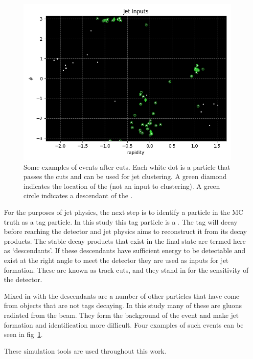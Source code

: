 \begin{figure}[htp]
\begin{minipage}[c]{0.48\textwidth}
        \includegraphics[width=1\textwidth]{graphics/truth_1378.png}
    \end{minipage}\hfill
    \caption{Some examples of events after cuts. Each white dot is a particle that
             passes the cuts and can be used for jet clustering.
             A green diamond indicates the location of the 
             (not an input to clustering).
         A green circle indicates a descendant of the .} \label{fig:event_tracks_example}
\end{figure}    


For the purposes of jet physics, the next step is to identify
a particle in the MC truth as a tag particle.
In this study this tag particle is a .
The tag will decay before reaching the detector and 
jet physics aims to reconstruct it from its decay products.
The stable decay products that exist in the final state 
are termed here as `descendants'.
If these descendants have sufficient energy to be detectable and exist
at the right angle to meet the detector they are used as inputs for jet formation.
These are known as track cuts, and they stand in for the sensitivity of the detector.

Mixed in with the descendants are a number of other particles that have come from objects
that are not tags decaying.
In this study many of these are gluons radiated from the beam.
They form the background of the event and make jet formation
and identification more difficult.
Four examples of such events can be seen in fig~\ref{fig:event_tracks_example}.

These simulation tools are used throughout this work.

